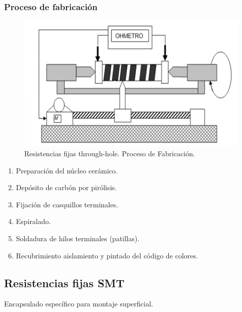 \subsubsection{Proceso de fabricación}
\begin{figure}[H]
    \centering
    \includegraphics[width=0.5\linewidth]{Imagenes/Resistencias Through Hole - Proceso de Fabricacion.png}
    \caption{Resistencias fijas through-hole. Proceso de Fabricación.}
\end{figure}

\begin{enumerate}
    \item Preparación del núcleo cerámico.
    \item Depósito de carbón por pirólisis.
    \item Fijación de casquillos terminales.
    \item Espiralado.
    \item Soldadura de hilos terminales (patillas).
    \item Recubrimiento aislamiento y pintado del código de colores.
\end{enumerate}

\subsection{Resistencias fijas SMT}
Encapsulado específico para montaje superficial.

